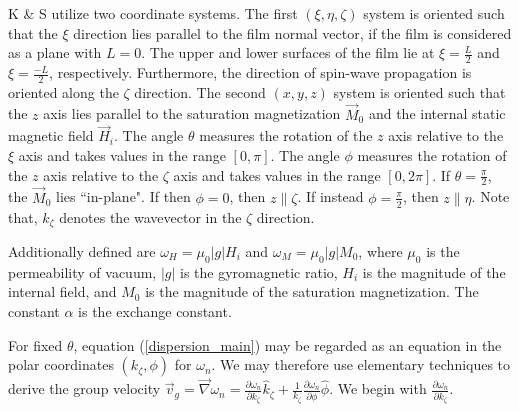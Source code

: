 \documentclass{article}
\begin{document}
K \& S utilize two coordinate systems. The first $(\xi,\eta,\zeta)$ system is oriented such that the $\xi$ direction lies parallel to the film normal vector, if the film is considered as a plane with $L=0$. The upper and lower surfaces of the film lie at $\xi = \frac{L}{2}$ and $\xi = \frac{-L}{2}$, respectively. Furthermore, the direction of spin-wave propagation is oriented along the $\zeta$ direction. The second $(x,y,z)$ system is oriented such that the $z$ axis lies parallel to the saturation magnetization $\vec{M}_{0}$ and the internal static magnetic field $\vec{H}_{i}$. The angle $\theta$ measures the rotation of the $z$ axis relative to the $\xi$ axis and takes values in the range $[0,\pi]$. The angle $\phi$ measures the rotation of the $z$ axis relative to the $\zeta$ axis and takes values in the range $[0, 2 \pi]$. If $\theta = \frac{\pi}{2}$, the $\vec{M}_{0}$ lies ``in-plane". If then $\phi = 0$, then $z \parallel \zeta$. If instead $\phi = \frac{\pi}{2}$, then $z \parallel \eta$. Note that, $k_{\zeta}$ denotes the wavevector in the $\zeta$ direction.

Additionally defined are $\omega_{H} = \mu_{0} |g| H_{i}$ and $\omega_{M} = \mu_{0} |g| M_{0}$, where $\mu_{0}$ is the permeability of vacuum, $|g|$ is the gyromagnetic ratio, $H_{i}$ is the magnitude of the internal field, and $M_{0}$ is the magnitude of the saturation magnetization. The constant $\alpha$ is the exchange constant.

For fixed $\theta$, equation (\ref{dispersion_main}) may be regarded as an equation in the polar coordinates $(k_{\zeta},\phi)$ for $\omega_{n}$. We may therefore use elementary techniques to derive the group velocity $\vec{v}_{g} = \vec{\nabla} \omega_{n} = \frac{\partial \omega_{n}}{\partial k_{\zeta}} \hat{k}_{\zeta} + \frac{1}{k_{\zeta}} \frac{\partial \omega_{n}}{\partial \phi} \hat{\phi}$. We begin with $\frac{\partial \omega_{n}}{\partial k_{\zeta}}$.
\end{document}
